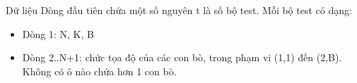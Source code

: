 Dữ liệu
Dòng đầu tiên chứa một số nguyên t là số bộ test. Mỗi bộ test có dạng:  
\begin{itemize}
	\item     Dòng 1: N, K, B   
	\item     Dòng 2..N+1: chức tọa độ của các con bò, trong phạm vi (1,1) đến (2,B). Không có ô nào chứa hơn 1 con bò.   
\end{itemize}